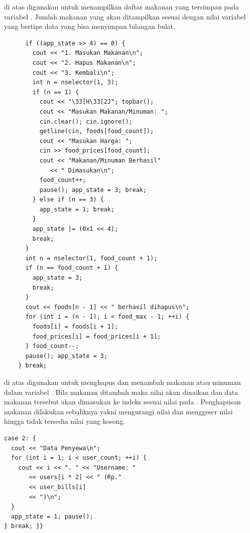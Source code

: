 \documentclass[../main.tex]{subfiles}
\begin{document}
{\Script} di atas digunakan untuk menampilkan daftar makanan yang tersimpan pada variabel {\sarray} . Jumlah makanan yang akan ditampilkan sesuai dengan nilai variabel  yang bertipe data  yang bisa menyimpan bilangan bulat.

\begin{code}
\begin{verbatim}
      if ((app_state >> 4) == 0) {
        cout << "1. Masukan Makanan\n";
        cout << "2. Hapus Makanan\n";
        cout << "3. Kembali\n";
        int n = nselector(1, 3);
        if (n == 1) {
          cout << "\33[H\33[2J"; topbar();
          cout << "Masukan Makanan/Minuman: ";
          cin.clear(); cin.ignore();
          getline(cin, foods[food_count]);
          cout << "Masukan Harga: ";
          cin >> food_prices[food_count];
          cout << "Makanan/Minuman Berhasil"
             << " Dimasukan\n";
          food_count++;
          pause(); app_state = 3; break;
        } else if (n == 3) {
          app_state = 1; break;
        }
        app_state |= (0x1 << 4);
        break;
      }
      int n = nselector(1, food_count + 1);
      if (n == food_count + 1) {
        app_state = 3;
        break;
      }
      cout << foods[n - 1] << " berhasil dihapus\n";
      for (int i = (n - 1); i < food_max - 1; ++i) {
        foods[i] = foods[i + 1];
        food_prices[i] = food_prices[i + 1];
      } food_count--;
      pause(); app_state = 3;
    } break;
\end{verbatim}
\end{code}

{\Script} di atas digunakan untuk menghapus dan menambah {\entry} makanan atau minuman dalam variabel {\sarray} . Bila makanan ditambah maka nilai  akan dinaikan dan data makanan tersebut akan dimasukan ke indeks sesuai nilai  pada . Penghapusan makanan dilakukan sebaliknya yakni mengurangi nilai  dan menggeser nilai  hingga tidak tersedia nilai yang kosong.

\begin{code}
\begin{verbatim}
case 2: {
  cout << "Data Penyewa\n";
  for (int i = 1; i < user_count; ++i) {
    cout << i << ". " << "Username: "
       << users[i * 2] << " (Rp."
       << user_bills[i]
       << ")\n";
  }
  app_state = 1; pause();
} break; }}
\end{verbatim}
\end{code}
\end{document}
